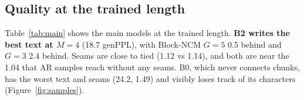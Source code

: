 \documentclass[10pt,twocolumn]{article}
\begin{document}
\subsection{Quality at the trained length}
\label{sec:quality}

\begin{table}[t]
\centering
\small
\caption{Main models at the trained length ($M{=}4$, 512 tokens) and at $M{=}6$ (768 tokens, never trained).
genPPL: mean $\pm$ sd over three training seeds; seam ratio: mean. NLL: the seed-2 runs, which share one
encoding of the validation set (NLL is comparable only within one encoding); $\Delta$ vs B2 with 95\% bootstrap
CI. B2 has the worst NLL on all three seeds.}
\label{tab:main}
\setlength{\tabcolsep}{2.4pt}
\end{table}

Table~\ref{tab:main} shows the main models at the trained length. \textbf{B2 writes the best text at $M{=}4$}
(18.7 genPPL), with Block-NCM $G{=}5$ 0.5 behind and $G{=}3$ 2.4 behind. Seams are close to tied (1.12 vs 1.14), and
both are near the 1.04 that AR samples reach without any seams. B0, which never connects chunks, has the worst text
and seams (24.2, 1.49) and visibly loses track of its characters (Figure~\ref{fig:samples}).
\end{document}
